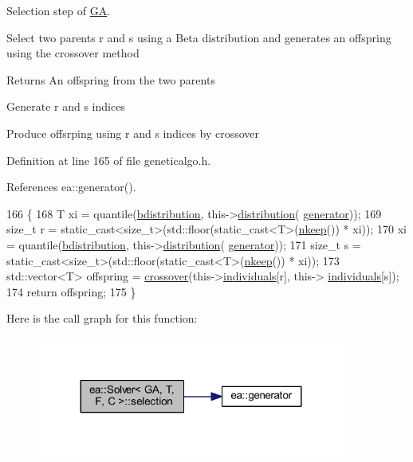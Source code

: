 Selection step of \hyperlink{structea_1_1_g_a}{GA}. 

Select two parents r and s using a Beta distribution and generates an offspring using the crossover method \begin{DoxyReturn}{Returns}
An offspring from the two parents 
\end{DoxyReturn}
Generate r and s indices

Produce offsrping using r and s indices by crossover 

Definition at line 165 of file geneticalgo.\+h.



References ea\+::generator().


\begin{DoxyCode}
166     \{
168         T xi = quantile(\hyperlink{classea_1_1_solver_3_01_g_a_00_01_t_00_01_f_00_01_c_01_4_a01dbd57c74c1ebd73e4ac976e29ecb33}{bdistribution}, this->\hyperlink{classea_1_1_solver__base_ae88f44b13e264e092d3bbaeca6b3bd19}{distribution}(
      \hyperlink{namespaceea_a385e8ca8ba4ae2f69dcfffa79f20c2ff}{generator}));
169         \textcolor{keywordtype}{size\_t} r = \textcolor{keyword}{static\_cast<}\textcolor{keywordtype}{size\_t}\textcolor{keyword}{>}(std::floor(static\_cast<T>(\hyperlink{classea_1_1_solver_3_01_g_a_00_01_t_00_01_f_00_01_c_01_4_a42fe3561ccfab0dd666410e243d977e5}{nkeep}()) * xi));
170         xi = quantile(\hyperlink{classea_1_1_solver_3_01_g_a_00_01_t_00_01_f_00_01_c_01_4_a01dbd57c74c1ebd73e4ac976e29ecb33}{bdistribution}, this->\hyperlink{classea_1_1_solver__base_ae88f44b13e264e092d3bbaeca6b3bd19}{distribution}(
      \hyperlink{namespaceea_a385e8ca8ba4ae2f69dcfffa79f20c2ff}{generator}));
171         \textcolor{keywordtype}{size\_t} s = \textcolor{keyword}{static\_cast<}\textcolor{keywordtype}{size\_t}\textcolor{keyword}{>}(std::floor(static\_cast<T>(\hyperlink{classea_1_1_solver_3_01_g_a_00_01_t_00_01_f_00_01_c_01_4_a42fe3561ccfab0dd666410e243d977e5}{nkeep}()) * xi));
173         std::vector<T> offspring = \hyperlink{classea_1_1_solver_3_01_g_a_00_01_t_00_01_f_00_01_c_01_4_ad197350b0ef8bc73293fe31978702f02}{crossover}(this->\hyperlink{classea_1_1_solver__base_ad75bc440d24a46e97694c7c889f2ecde}{individuals}[r], this->
      \hyperlink{classea_1_1_solver__base_ad75bc440d24a46e97694c7c889f2ecde}{individuals}[s]);
174         \textcolor{keywordflow}{return} offspring;
175     \}
\end{DoxyCode}
Here is the call graph for this function\+:
\nopagebreak
\begin{figure}[H]
\begin{center}
\leavevmode
\includegraphics[width=287pt]{classea_1_1_solver_3_01_g_a_00_01_t_00_01_f_00_01_c_01_4_a1bc73c28211d7ba80665b286fbdea948_cgraph}
\end{center}
\end{figure}



